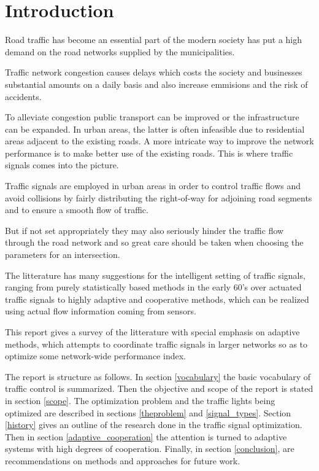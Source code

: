 \section{Introduction}
Road traffic has become an essential part of the modern society has put a high demand on the road networks supplied by the municipalities. 

Traffic network congestion causes delays which costs the society and businesses substantial amounts on a daily basis and also increase emmisions and the risk of accidents.

To alleviate congestion public transport can be improved or the infrastructure can be expanded. In urban areas, the latter is often infeasible due to residential areas adjacent to the existing roads. 
A more intricate way to improve the network performance is to make better use of the existing roads. This is where traffic signals comes into the picture. 

Traffic signals are employed in urban areas in order to control traffic flows and avoid collisions by fairly distributing the right-of-way for adjoining road segments and to ensure a smooth flow of traffic.

But if not set appropriately they may also seriously hinder the traffic flow through the road network and so great care should be taken when choosing the parameters for an intersection. 

The litterature has many suggestions for the intelligent setting of traffic signals, ranging from purely statistically based methods in the early 60's over actuated traffic signals to highly adaptive and cooperative methods, which can be realized using actual flow information coming from sensors. 

This report gives a survey of the litterature with special emphasis on adaptive methods, which attempts to coordinate traffic signals in larger networks so as to optimize some network-wide performance index. 

The report is structure as follows. In section \ref{vocabulary} the basic vocabulary of traffic control is summarized. Then the objective and scope of the report is stated in section \ref{scope}. 
The optimization problem and the traffic lights being optimized are described in sections \ref{theproblem} and \ref{signal_types}.
Section \ref{history} gives an outline of the research done in the traffic signal optimization. Then in section \ref{adaptive_cooperation} the attention is turned to adaptive systems with high degrees of cooperation.
Finally, in section \ref{conclusion}, are recommendations on methods and approaches for future work.